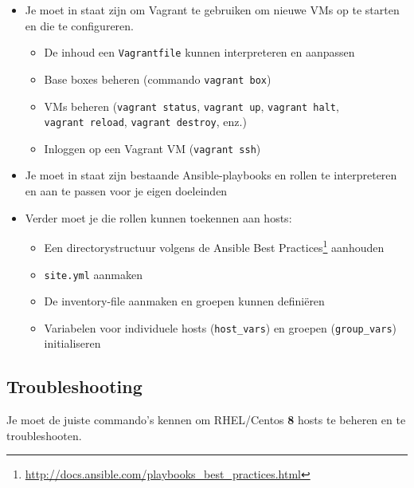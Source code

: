 \begin{itemize}
  \item Je moet in staat zijn om Vagrant te gebruiken om nieuwe VMs op te starten en die te configureren.
  
  \begin{itemize}
    \item De inhoud een \texttt{Vagrantfile} kunnen interpreteren en aanpassen
    \item Base boxes beheren (commando \texttt{vagrant\ box})
    \item VMs beheren (\texttt{vagrant\ status}, \texttt{vagrant\ up}, \texttt{vagrant\ halt}, \texttt{vagrant\ reload}, \texttt{vagrant\ destroy}, enz.)
    \item Inloggen op een Vagrant VM (\texttt{vagrant\ ssh})
  \end{itemize}

  \item Je moet in staat zijn bestaande Ansible-playbooks en rollen te interpreteren en aan te passen voor je eigen doeleinden
  
  \item Verder moet je die rollen kunnen toekennen aan hosts:
  
  \begin{itemize}
    \item Een directorystructuur volgens de Ansible Best Practices\footnote{\url{http://docs.ansible.com/playbooks_best_practices.html}} aanhouden
    \item \texttt{site.yml} aanmaken
    \item De inventory-file aanmaken en groepen kunnen definiëren
    \item Variabelen voor individuele hosts (\texttt{host\_vars}) en groepen (\texttt{group\_vars}) initialiseren
  \end{itemize}
\end{itemize}

\subsection{Troubleshooting}%
\label{ssec:troubleshooting}

Je moet de juiste commando's kennen om RHEL/Centos \textbf{8} hosts te
beheren en te troubleshooten.

